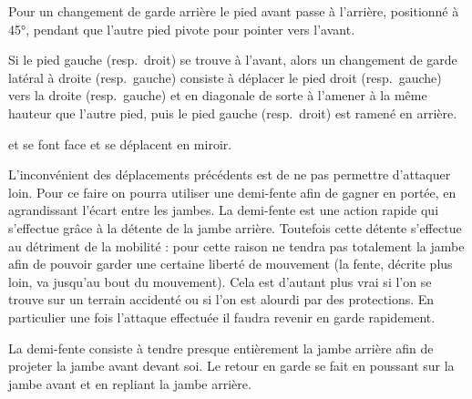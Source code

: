 \begin{definition}

	Pour un changement de garde arrière le pied avant passe à l'arrière, positionné à 45°, pendant que l'autre pied pivote pour pointer vers l'avant.
\end{definition}


\begin{definition}

	Si le pied gauche (resp.\ droit) se trouve à l'avant, alors un changement de garde latéral à droite (resp.\ gauche) consiste à déplacer le pied droit (resp.\ gauche) vers la droite (resp.\ gauche) et en diagonale de sorte à l'amener à la même hauteur que l'autre pied, puis le pied gauche (resp.\ droit) est ramené en arrière.
\end{definition}


\begin{exercice}
	\label{ex:general:miroir}
	


	\A et \D se font face et se déplacent en miroir.
\end{exercice}


L'inconvénient des déplacements précédents est de ne pas permettre d'attaquer loin.
Pour ce faire on pourra utiliser une demi-fente afin de gagner en portée, en agrandissant l'écart entre les jambes.
La demi-fente est une action rapide qui s'effectue grâce à la détente de la jambe arrière.
Toutefois cette détente s'effectue au détriment de la mobilité : pour cette raison ne tendra pas totalement la jambe afin de pouvoir garder une certaine liberté de mouvement (la fente, décrite plus loin, va jusqu'au bout du mouvement).
Cela est d'autant plus vrai si l'on se trouve sur un terrain accidenté ou si l'on est alourdi par des protections.
En particulier une fois l'attaque effectuée il faudra revenir en garde rapidement.

\begin{definition}
	\label{dep:def:demi-fente}

	La demi-fente consiste à tendre presque entièrement la jambe arrière afin de projeter la jambe avant devant soi.
	Le retour en garde se fait en poussant sur la jambe avant et en repliant la jambe arrière.
\end{definition}


